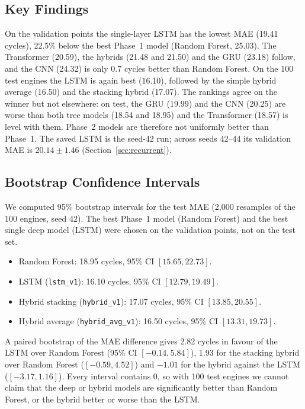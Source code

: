 \subsection{Key Findings}
On the validation points the single-layer LSTM has the lowest MAE (19.41 cycles), 22.5\% below the best Phase~1 model (Random Forest, 25.03).  The Transformer (20.59), the hybrids (21.48 and 21.50) and the GRU (23.18) follow, and the CNN (24.32) is only 0.7 cycles better than Random Forest.  On the 100 test engines the LSTM is again best (16.10), followed by the simple hybrid average (16.50) and the stacking hybrid (17.07).  The rankings agree on the winner but not elsewhere: on test, the GRU (19.99) and the CNN (20.25) are worse than both tree models (18.54 and 18.95) and the Transformer (18.57) is level with them.  Phase~2 models are therefore not uniformly better than Phase~1.  The saved LSTM is the seed-42 run; across seeds 42--44 its validation MAE is $20.14\pm1.46$ (Section~\ref{sec:recurrent}).

\subsection{Bootstrap Confidence Intervals}
We computed 95\% bootstrap intervals for the test MAE (2,000 resamples of the 100 engines, seed 42).  The best Phase~1 model (Random Forest) and the best single deep model (LSTM) were chosen on the validation points, not on the test set.
\begin{itemize}
  \item Random Forest: 18.95 cycles, 95\% CI $[15.65, 22.73]$.
  \item LSTM (\texttt{lstm\_v1}): 16.10 cycles, 95\% CI $[12.79, 19.49]$.
  \item Hybrid stacking (\texttt{hybrid\_v1}): 17.07 cycles, 95\% CI $[13.85, 20.55]$.
  \item Hybrid average (\texttt{hybrid\_avg\_v1}): 16.50 cycles, 95\% CI $[13.31, 19.73]$.
\end{itemize}
A paired bootstrap of the MAE difference gives 2.82 cycles in favour of the LSTM over Random Forest (95\% CI $[-0.14, 5.84]$), 1.93 for the stacking hybrid over Random Forest ($[-0.59, 4.52]$) and $-1.01$ for the hybrid against the LSTM ($[-3.17, 1.16]$).  Every interval contains 0, so with 100 test engines we cannot claim that the deep or hybrid models are significantly better than Random Forest, or the hybrid better or worse than the LSTM.

